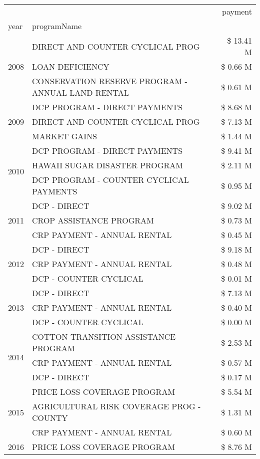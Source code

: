 \begin{tabular}{llr}
\toprule
 &  & payment \\
year & programName &  \\
\midrule
\multirow[t]{3}{*}{2008} & DIRECT AND COUNTER CYCLICAL PROG & \$ 13.41 M \\
 & LOAN DEFICIENCY & \$ 0.66 M \\
 & CONSERVATION RESERVE PROGRAM - ANNUAL LAND RENTAL & \$ 0.61 M \\
\cline{1-3}
\multirow[t]{3}{*}{2009} & DCP PROGRAM - DIRECT PAYMENTS & \$ 8.68 M \\
 & DIRECT AND COUNTER CYCLICAL PROG & \$ 7.13 M \\
 & MARKET GAINS & \$ 1.44 M \\
\cline{1-3}
\multirow[t]{3}{*}{2010} & DCP PROGRAM - DIRECT PAYMENTS & \$ 9.41 M \\
 & HAWAII SUGAR DISASTER PROGRAM & \$ 2.11 M \\
 & DCP PROGRAM - COUNTER CYCLICAL PAYMENTS & \$ 0.95 M \\
\cline{1-3}
\multirow[t]{3}{*}{2011} & DCP - DIRECT & \$ 9.02 M \\
 & CROP ASSISTANCE PROGRAM & \$ 0.73 M \\
 & CRP PAYMENT - ANNUAL RENTAL & \$ 0.45 M \\
\cline{1-3}
\multirow[t]{3}{*}{2012} & DCP - DIRECT & \$ 9.18 M \\
 & CRP PAYMENT - ANNUAL RENTAL & \$ 0.48 M \\
 & DCP - COUNTER CYCLICAL & \$ 0.01 M \\
\cline{1-3}
\multirow[t]{3}{*}{2013} & DCP - DIRECT & \$ 7.13 M \\
 & CRP PAYMENT - ANNUAL RENTAL & \$ 0.40 M \\
 & DCP - COUNTER CYCLICAL & \$ 0.00 M \\
\cline{1-3}
\multirow[t]{3}{*}{2014} & COTTON TRANSITION ASSISTANCE PROGRAM & \$ 2.53 M \\
 & CRP PAYMENT - ANNUAL RENTAL & \$ 0.57 M \\
 & DCP - DIRECT & \$ 0.17 M \\
\cline{1-3}
\multirow[t]{3}{*}{2015} & PRICE LOSS COVERAGE PROGRAM & \$ 5.54 M \\
 & AGRICULTURAL RISK COVERAGE PROG - COUNTY & \$ 1.31 M \\
 & CRP PAYMENT - ANNUAL RENTAL & \$ 0.60 M \\
\cline{1-3}
\multirow[t]{3}{*}{2016} & PRICE LOSS COVERAGE PROGRAM                   & \$ 8.76 M \\

\end{tabular}
